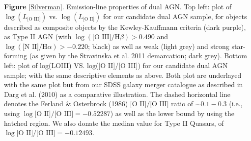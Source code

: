 \label{Silverman} \textbf{Figure} \ref{Silverman}. Emission-line properties of dual AGN. Top left: plot of $\log{(L_{\text{[O III]}})}$ vs. $\log{(L_{\text{[O II]}})}$ for our candidate dual AGN sample, for objects described as composite objects by the Kewley-Kauffmann criteria (dark purple), as Type II AGN (with $\log(\text{[O III]}/\text{H}\beta)>{0.490}$ and $\log(\text{[N II]}/\text{H}\alpha)>{-0.220}$; black) as well as weak (light grey) and strong star-forming (as given by the Stravinska et al. 2011 demarcation; dark grey). Bottom left: plot of log(LOIII) VS. log([O II]/[O III]) for our candidate dual AGN sample; with the same descriptive elements as above. Both plot are underlayed with the same plot but from our SDSS galaxy merger catalogue as described in Darg et al. (2010) as a comparative illustration. The dashed horizontal line denotes the Ferland & Osterbrock (1986) $\text{[O II]/[O III]}$ ratio of $\sim{0.1-0.3}$ (i.e., using $\log{\text{[O II]/[O III]}}=-0.52287$) as well as the lower bound by using the hatched region. We also donate the \cite{Zakamska2003} median value for Type II Quasars, of $\log{\text{[O II]/[O III]}}=-0.12493$.